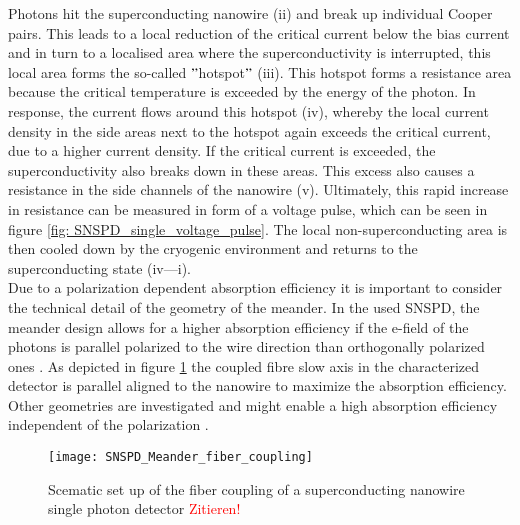 Photons hit the superconducting nanowire (ii) and break up individual Cooper pairs.
This leads to a local reduction of the critical current below the bias current and in turn to a localised area where
the superconductivity is interrupted, this local area forms the so-called \("\)hotspot\("\) (iii).
This hotspot forms a resistance area because the critical temperature is exceeded by the energy of the photon.
In response, the current flows around this hotspot (iv), whereby the local current density in the side areas next to the
hotspot again exceeds the critical current, due to a higher current density.
If the critical current is exceeded, the superconductivity also breaks down in these areas.
This excess also causes a resistance in the side channels of the nanowire (v).
Ultimately, this rapid increase in resistance can be measured in form of a voltage pulse, which can be seen in figure \ref{fig: SNSPD_single_voltage_pulse}.
The local non-superconducting area is then cooled down by the cryogenic environment and returns to the superconducting state
(iv—i).\\



Due to a polarization dependent absorption efficiency it is important to consider the technical detail of the geometry of the meander.
In the used SNSPD, the meander design allows for a higher absorption efficiency if the e-field of the photons
is parallel polarized to the wire direction than orthogonally polarized ones \cite{single-quantum-2022}.
As depicted in figure \ref{fig:SNSPD_fiber_coupling} the coupled fibre slow axis in the characterized
detector is parallel aligned to the nanowire to maximize the absorption efficiency.
Other geometries are investigated and might enable a high absorption efficiency independent of the polarization \cite{zheng-2016}.



\begin{figure}[hhh]
    \centering
    \texttt{[image: SNSPD\_Meander\_fiber\_coupling]}
    \caption{Scematic set up of the fiber coupling of a superconducting nanowire single photon detector \textcolor{red}{Zitieren!}}
    \label{fig:SNSPD_fiber_coupling}
\end{figure}


